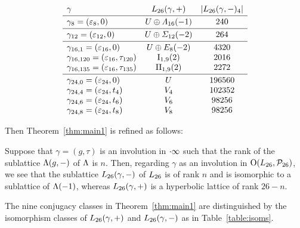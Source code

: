 \documentclass{amsart} %
\begin{document}
\begin{table}
\[
\begin{array}{lc c }
\gamma & \Lts(\gamma, +) & |\Lts(\gamma, -)_4|
\mystrutd{5pt} \\
\hline 
\gamma_{8}=(\vep_8, 0) & U\oplus \Lamsxtn(-1) & 240
\mystruthd{10pt}{5pt} \\
\hline
\gamma_{12}=(\vep_{12}, 0) & U\oplus \Sigmatwlv(-2) & 264
\mystruthd{10pt}{5pt} \\
\hline
\mystruth{10pt}
\gamma_{16, 1}=(\vep_{16}, 0) &U\oplus E_8(-2) &4320\\
\gamma_{16, 120} =(\vep_{16}, \tau_{120}) & \typeILat_{1, 9}(2) &2016\\
\gamma_{16, 135} =(\vep_{16}, \tau_{135}) & \typeIILat_{1, 9}(2) &2272
\mystrutd{5pt}\\
\hline
\mystruth{10pt}
\gamma_{24, 0}=( \vep_{24}, 0)& U &196560\\
\gamma_{24, 4}=(\vep_{24},t_4)& V_{4} & 102352 \\
\gamma_{24, 6}=( \vep_{24}, t_6) & V_{6} &98256\\
\gamma_{24, 8}=( \vep_{24}, t_8) & V_{8} &98256
\end{array}
\]
\vskip 10pt
\caption{$\Lts(\gamma, +)$ and $\Lts(\gamma,-)$}\label{table:isoms}
\end{table}
%
\par
Then Theorem~\ref{thm:main1} is refined as follows:
%
\begin{theorem}\label{thm:main2}
Suppose that $\gamma=(g, \tau)$ is an involution 
in $\cdot \infty$ such that the rank of the sublattice $\Lambda(g, -)$ of $\Lambda$ is $n$.
Then,
regarding  $\gamma$ as an involution in $\mathord{\mathrm{O}}(L_{26}, \mathord{\mathcal{P}}_{26})$,
we see that the sublattice  $\Lts(\gamma, -)$ of $L_{26}$ is of rank $n$ and is isomorphic to a sublattice of $\Lambda (-1)$, 
whereas $\Lts(\gamma, +)$ is a hyperbolic lattice of rank $26-n$.
\par
The nine conjugacy classes in Theorem~\ref{thm:main1} are distinguished by 
the isomorphism classes of $\Lts(\gamma, +)$ and $\Lts(\gamma,-)$ as in Table~\ref{table:isoms}.
\end{theorem}
\end{document}

